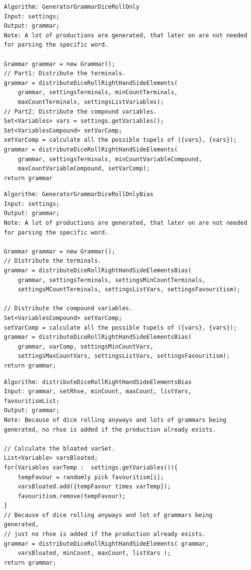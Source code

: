 \lstset{language=java}
\begin{lstlisting}[frame=htrbl,caption={GeneratorGrammarDiceRollOnly}, 
label={lst:GeneratorGrammarDiceRollOnly}]
Algorithm: GeneratorGrammarDiceRollOnly
Input: settings;
Output: grammar;
Note: A lot of productions are generated, that later on are not needed
for parsing the specific word.

Grammar grammar = new Grammar();
// Part1: Distribute the terminals.
grammar = distributeDiceRollRightHandSideElements(
	grammar, settingsTerminals, minCountTerminals, 
	maxCountTerminals, settingsListVariables);
// Part2: Distribute the compound variables.
Set<Variables> vars = settings.getVariables();
Set<VariablesCompound> setVarComp;
setVarComp = calculate all the possible tupels of ({vars}, {vars});
grammar = distributeDiceRollRightHandSideElements(
	grammar, settingsTerminals, minCountVariableCompound, 
	maxCountVariableCompound, setVarComp);
return grammar
\end{lstlisting}

\pagebreak

\lstset{language=java}
\begin{lstlisting}[frame=htrbl,caption={GeneratorGrammarDiceRollOnlyBias}, 
label={lst:GeneratorGrammarDiceRollOnlyBias}]
Algorithm: GeneratorGrammarDiceRollOnlyBias
Input: settings;
Output: grammar;
Note: A lot of productions are generated, that later on are not needed
for parsing the specific word.

Grammar grammar = new Grammar();
// Distribute the terminals.
grammar = distributeDiceRollRightHandSideElementsBias(
	grammar, settingsTerminals, settingsMinCountTerminals, 
	settingsMCountTerminals, settingsListVars, settingsFavouritism);

// Distribute the compound variables.
Set<VariablesCompound> setVarComp;
setVarComp = calculate all the possible tupels of ({vars}, {vars});
grammar = distributeDiceRollRightHandSideElementsBias(
	grammar, varComp, settingsMinCountVars,
	settingsMaxCountVars, settingsListVars, settingsFavouritism);
return grammar;
\end{lstlisting}

\pagebreak

\lstset{language=java}
\begin{lstlisting}[frame=htrbl,caption={distributeDiceRollRightHandSideElementsBias}, 
label={lst:distributeDiceRollRightHandSideElementsBias}]
Algorithm: distributeDiceRollRightHandSideElementsBias
Input: grammar, setRhse, minCount, maxCount, listVars, favouritismList;
Output: grammar;
Note: Because of dice rolling anyways and lots of grammars being 
generated, no rhse is added if the production already exists.

// Calculate the bloated varSet.
List<Variable> varsBloated;
for(Variables varTemp :  settings.getVariables()){
	tempFavour = randomly pick favouritism[i];
	varsBloated.add({tempFavour times varTemp});
	favouritism.remove(tempFavour);
}
// Because of dice rolling anyways and lot of grammars being generated, 
// just no rhse is added if the production already exists.
grammar = distributeDiceRollRightHandSideElements( grammar,
	varsBloated, minCount, maxCount, listVars );
return grammar;
\end{lstlisting}

